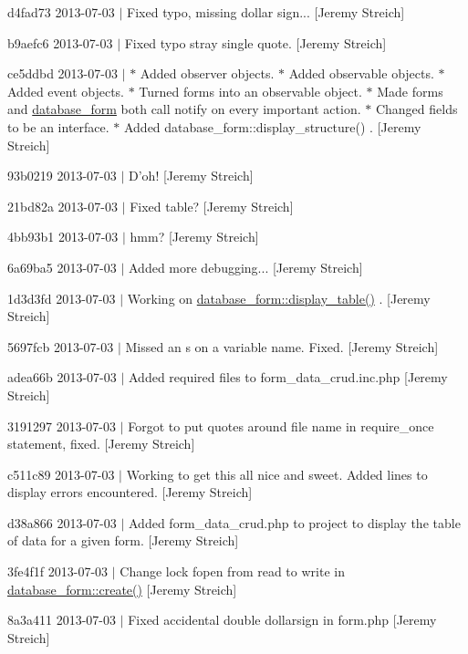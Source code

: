 \begin{DoxyItemize}
\item d4fad73 2013-\/07-\/03 $|$ Fixed typo, missing dollar sign... \mbox{[}Jeremy Streich\mbox{]}
\item b9aefc6 2013-\/07-\/03 $|$ Fixed typo stray single quote. \mbox{[}Jeremy Streich\mbox{]}
\item ce5ddbd 2013-\/07-\/03 $|$ $\ast$ Added observer objects. $\ast$ Added observable objects. $\ast$ Added event objects. $\ast$ Turned forms into an observable object. $\ast$ Made forms and \hyperlink{classdatabase__form}{database\-\_\-form} both call notify on every important action. $\ast$ Changed fields to be an interface. $\ast$ Added database\-\_\-form\-::display\-\_\-structure() . \mbox{[}Jeremy Streich\mbox{]}
\item 93b0219 2013-\/07-\/03 $|$ D'oh! \mbox{[}Jeremy Streich\mbox{]}
\item 21bd82a 2013-\/07-\/03 $|$ Fixed table? \mbox{[}Jeremy Streich\mbox{]}
\item 4bb93b1 2013-\/07-\/03 $|$ hmm? \mbox{[}Jeremy Streich\mbox{]}
\item 6a69ba5 2013-\/07-\/03 $|$ Added more debugging... \mbox{[}Jeremy Streich\mbox{]}
\item 1d3d3fd 2013-\/07-\/03 $|$ Working on \hyperlink{classdatabase__form_a73106bec9001ca0fe255e74a37982072}{database\-\_\-form\-::display\-\_\-table()} . \mbox{[}Jeremy Streich\mbox{]}
\item 5697fcb 2013-\/07-\/03 $|$ Missed an s on a variable name. Fixed. \mbox{[}Jeremy Streich\mbox{]}
\item adea66b 2013-\/07-\/03 $|$ Added required files to form\-\_\-data\-\_\-crud.\-inc.\-php \mbox{[}Jeremy Streich\mbox{]}
\item 3191297 2013-\/07-\/03 $|$ Forgot to put quotes around file name in require\-\_\-once statement, fixed. \mbox{[}Jeremy Streich\mbox{]}
\item c511c89 2013-\/07-\/03 $|$ Working to get this all nice and sweet. Added lines to display errors encountered. \mbox{[}Jeremy Streich\mbox{]}
\item d38a866 2013-\/07-\/03 $|$ Added form\-\_\-data\-\_\-crud.\-php to project to display the table of data for a given form. \mbox{[}Jeremy Streich\mbox{]}
\item 3fe4f1f 2013-\/07-\/03 $|$ Change lock fopen from read to write in \hyperlink{classdatabase__form_a2f217d182a55038d501b66f2a2d51abc}{database\-\_\-form\-::create()} \mbox{[}Jeremy Streich\mbox{]}
\item 8a3a411 2013-\/07-\/03 $|$ Fixed accidental double dollarsign in form.\-php \mbox{[}Jeremy Streich\mbox{]}

\end{DoxyItemize}
